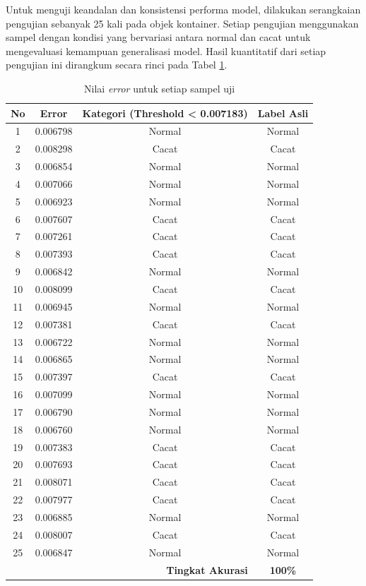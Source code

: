 Untuk menguji keandalan dan konsistensi performa model, dilakukan
serangkaian pengujian sebanyak 25 kali pada objek kontainer. Setiap
pengujian menggunakan sampel dengan kondisi yang bervariasi antara
normal dan cacat untuk mengevaluasi kemampuan generalisasi model.
Hasil kuantitatif dari setiap pengujian ini dirangkum secara rinci
pada Tabel \ref{tab:error-samples-web}.

\begin{table}[H]
  \centering
  \caption{Nilai \textit{error} untuk setiap sampel uji}
  \label{tab:error-samples-web}
  \begin{tabular}{cccc}
    \toprule
    \textbf{No} & \textbf{Error} & \textbf{Kategori
      (Threshold <
    0.007183)} & \textbf{Label Asli} \\
    \midrule
    1  & 0.006798 & Normal & Normal \\
    2  & 0.008298 & Cacat & Cacat \\
    3  & 0.006854 & Normal & Normal \\
    4  & 0.007066 & Normal & Normal \\
    5  & 0.006923 & Normal & Normal \\
    6  & 0.007607 & Cacat & Cacat \\
    7  & 0.007261 & Cacat & Cacat \\
    8  & 0.007393 & Cacat & Cacat \\
    9  & 0.006842 & Normal & Normal \\
    10 & 0.008099 & Cacat & Cacat \\
    11 & 0.006945 & Normal & Normal \\
    12 & 0.007381 & Cacat & Cacat \\
    13 & 0.006722 & Normal & Normal \\
    14 & 0.006865 & Normal & Normal \\
    15 & 0.007397 & Cacat & Cacat \\
    16 & 0.007099 & Normal & Normal \\
    17 & 0.006790 & Normal & Normal \\
    18 & 0.006760 & Normal & Normal \\
    19 & 0.007383 & Cacat & Cacat \\
    20 & 0.007693 & Cacat & Cacat \\
    21 & 0.008071 & Cacat & Cacat \\
    22 & 0.007977 & Cacat & Cacat \\
    23 & 0.006885 & Normal & Normal \\
    24 & 0.008007 & Cacat & Cacat \\
    25 & 0.006847 & Normal & Normal \\
    \midrule
    \multicolumn{3}{r}{\textbf{Tingkat Akurasi}} & \textbf{100\%} \\
    \bottomrule
  \end{tabular}
\end{table}

